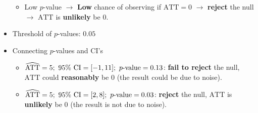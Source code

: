 \documentclass[10pt, letterpaper]{article}
\def\ATT{\mathrm{ATT}}
\def\CI{\mathrm{CI}}
\begin{document}
\begin{itemize}
\begin{itemize}
		\item Low $p$-value $\rightarrow$ \textbf{Low} chance of observing if $\ATT=0$ $\rightarrow$ \textbf{reject} the null $\rightarrow$ $\ATT$ is \textbf{unlikely} be $0$.
	\end{itemize}
	\item Threshold of $p$-values: $0.05$
	\item Connecting $p$-values and $\CI$'s
	\begin{itemize}
		\item $\widehat{\ATT}=5;\ 95\%\ \CI=\qty[-1,11];\ p\text{-value}=0.13$: \textbf{fail to reject} the null, $\ATT$ could \textbf{reasonably} be $0$ (the result could be due to noise).
		\item $\widehat{\ATT}=5;\ 95\%\ \CI=\qty[2,8];\ p\text{-value}=0.03$: \textbf{reject} the null, $\ATT$ is \textbf{unlikely} be $0$ (the result is not due to noise).
	\end{itemize}
\end{itemize}
\label{LastPage}
\end{document}
